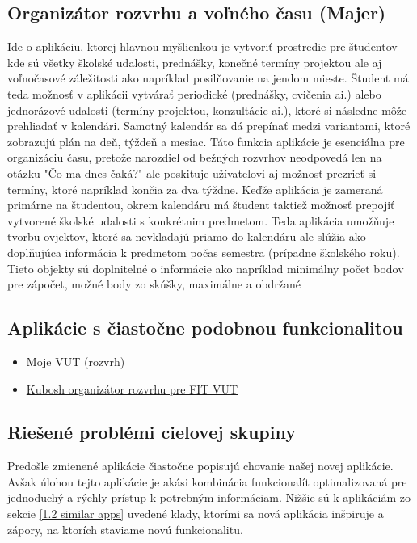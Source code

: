 \documentclass[a4paper, 11pt, onecolumn]{article}
\begin{document}
\subsection{Organizátor rozvrhu a voľného času (Majer)}
Ide o aplikáciu, ktorej hlavnou myšlienkou je vytvoriť prostredie pre študentov kde sú všetky školské 
udalosti, prednášky, konečné termíny projektou ale aj voľnočasové záležitosti ako napríklad posilňovanie 
na jendom mieste. Študent má teda možnosť v aplikácii vytvárať periodické (prednášky, cvičenia ai.)
alebo jednorázové udalosti (termíny projektou, konzultácie ai.), ktoré si následne môže prehliadať
v kalendári. Samotný kalendár sa dá prepínať medzi variantami, ktoré zobrazujú plán na deň, týždeň a 
mesiac. Táto funkcia aplikácie je esenciálna pre organizáciu času, pretože narozdiel od bežných 
rozvrhov neodpovedá len na otázku "Čo ma dnes čaká?" ale poskituje užívatelovi aj možnosť prezrieť si
termíny, ktoré napríklad končia za dva týždne. Keďže aplikácia je zameraná primárne na študentou,
okrem kalendáru má študent taktiež možnosť prepojiť vytvorené školské udalosti s konkrétnim predmetom.
Teda aplikácia umožňuje tvorbu ovjektov, ktoré sa nevkladajú priamo do kalendáru ale slúžia ako 
doplňujúca informácia k predmetom počas semestra (prípadne školského roku). Tieto objekty sú doplnitelné
o informácie ako napríklad minimálny počet bodov pre zápočet, možné body zo skúšky, maximálne a obdržané 

\subsection*{Aplikácie s čiastočne podobnou funkcionalitou}
\label{1.2 similar apps}
\begin{itemize}
  \item Moje VUT (rozvrh)
  \item \href{https://www.kubosh.net/apps/fitsch/}{Kubosh organizátor rozvrhu pre FIT VUT}
\end{itemize}

\subsection*{Riešené problémi cielovej skupiny} 
Predošle zmienené aplikácie čiastočne popisujú chovanie našej novej aplikácie. Avšak úlohou tejto 
aplikácie je akási kombinácia funkcionalít optimalizovaná pre jednoduchý a rýchly prístup k potrebným
informáciam. Nižšie sú k aplikáciám zo sekcie \ref{1.2 similar apps} uvedené klady, ktorími sa nová aplikácia 
inšpiruje a zápory, na ktorích staviame novú funkcionalitu.
\end{document}

